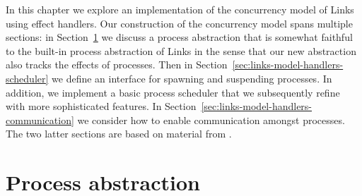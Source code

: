 \documentclass[12pt,mscres,cdtppar,twoside,openright,logo,rightchapter,normalheadings]{infthesis}
\theoremstyle{definition}
\begin{document}
In this chapter we explore an implementation of the concurrency model
of Links using effect handlers. Our construction of the concurrency
model spans multiple sections: in
Section~\ref{sec:links-model-handlers-process} we discuss a process
abstraction that is somewhat faithful to the built-in process
abstraction of Links in the sense that our new abstraction also tracks
the effects of processes. Then in
Section~\ref{sec:links-model-handlers-scheduler} we define an
interface for spawning and suspending processes. In addition, we
implement a basic process scheduler that we subsequently refine with
more sophisticated features. In
Section~\ref{sec:links-model-handlers-communication} we consider how
to enable communication amongst processes. The two latter sections are
based on material from \cite{Hillerstrom2016c}.

\section{Process abstraction}
\label{sec:links-model-handlers-process}
\end{document}
